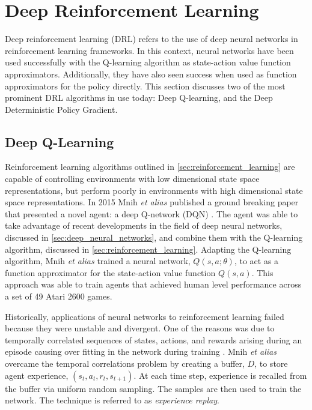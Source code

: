 \section{Deep Reinforcement Learning}\label{sec:deep_reinforcement_learning}
Deep reinforcement learning (DRL) refers to the use of deep neural networks in reinforcement learning frameworks. In this context, neural networks have been used successfully with the Q-learning algorithm as state-action value function approximators. Additionally, they have also seen success when used as function approximators for the policy directly. This section discusses two of the most prominent DRL algorithms in use today: Deep Q-learning, and the Deep Deterministic Policy Gradient.

\subsection{Deep Q-Learning}\label{ssec:deep_q_learning}
Reinforcement learning algorithms outlined in \textsection \ref{sec:reinforcement_learning} are capable of controlling environments with low dimensional state space representations, but perform poorly in environments with high dimensional state space representations. In 2015 Mnih \textit{et alias} published a ground breaking paper that presented a novel agent: a deep Q-network (DQN) \cite{Mnih2015}. The agent was able to take advantage of recent developments in the field of deep neural networks, discussed in \textsection \ref{sec:deep_neural_networks}, and combine them with the Q-learning algorithm, discussed in \textsection \ref{sec:reinforcement_learning}. Adapting the Q-learning algorithm, Mnih \textit{et alias} trained a neural network, $Q(s,a;\theta)$, to act as a function approximator for the state-action value function $Q(s,a)$. This approach was able to train agents that achieved human level performance across a set of 49 Atari 2600 games.

Historically, applications of neural networks to reinforcement learning failed because they were unstable and divergent. One of the reasons was due to temporally correlated sequences of states, actions, and rewards arising during an episode causing over fitting in the network during training \cite{Tsitsiklis1997}. Mnih \textit{et alias} overcame the temporal correlations problem by creating a buffer, $D$, to store agent experience, $(s_t, a_t, r_t, s_{t+1})$. At each time step, experience is recalled from the buffer via uniform random sampling. The samples are then used to train the network. The technique is referred to as \textit{experience replay}.

